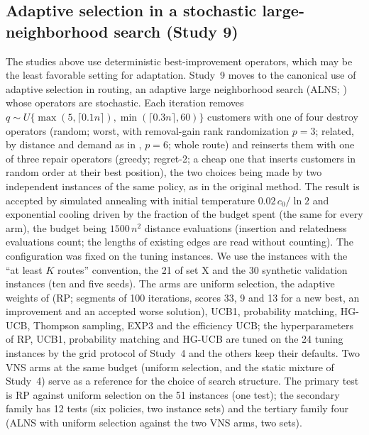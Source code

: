 \subsection{Adaptive selection in a stochastic large-neighborhood search (Study 9)}\label{sec:s9design}
The studies above use deterministic best-improvement operators, which may be the least favorable setting for adaptation. Study~9 moves to the canonical use of adaptive selection in routing, an adaptive large neighborhood search (ALNS; \citealp{ropke2006}) whose operators are stochastic. Each iteration removes $q\sim U\{\max(5,\lceil0.1n\rceil),\min(\lceil0.3n\rceil,60)\}$ customers with one of four destroy operators (random; worst, with removal-gain rank randomization $p=3$; related, by distance and demand as in \citealp{ropke2006}, $p=6$; whole route) and reinserts them with one of three repair operators (greedy; regret-2; a cheap one that inserts customers in random order at their best position), the two choices being made by two independent instances of the same policy, as in the original method. The result is accepted by simulated annealing with initial temperature $0.02\,c_0/\ln2$ and exponential cooling driven by the fraction of the budget spent (the same for every arm), the budget being $1500\,n^2$ distance evaluations (insertion and relatedness evaluations count; the lengths of existing edges are read without counting). The configuration was fixed on the tuning instances. We use the instances with the ``at least $K$ routes'' convention, the 21 of set X and the 30 synthetic validation instances (ten and five seeds). The arms are uniform selection, the adaptive weights of \citet{ropke2006} (RP; segments of 100 iterations, scores 33, 9 and 13 for a new best, an improvement and an accepted worse solution), UCB1, probability matching, HG-UCB, Thompson sampling, EXP3 and the efficiency UCB; the hyperparameters of RP, UCB1, probability matching and HG-UCB are tuned on the 24 tuning instances by the grid protocol of Study~4 and the others keep their defaults. Two VNS arms at the same budget (uniform selection, and the static mixture of Study~4) serve as a reference for the choice of search structure. The primary test is RP against uniform selection on the 51 instances (one test); the secondary family has 12 tests (six policies, two instance sets) and the tertiary family four (ALNS with uniform selection against the two VNS arms, two sets).

